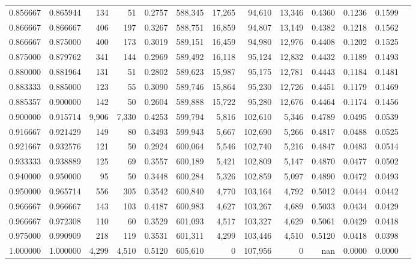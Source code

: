 \begin{tabular}{rrrrrrrrrrrrr}
0.856667 & 0.865944 &    134 &     51 &                                     0.2757 & 588,345 &  17,265 &  94,610 &  13,346 & 0.4360 & 0.1236 & 0.1599 \\
0.866667 & 0.866667 &    406 &    197 &                                     0.3267 & 588,751 &  16,859 &  94,807 &  13,149 & 0.4382 & 0.1218 & 0.1562 \\
0.866667 & 0.875000 &    400 &    173 &                                     0.3019 & 589,151 &  16,459 &  94,980 &  12,976 & 0.4408 & 0.1202 & 0.1525 \\
0.875000 & 0.879762 &    341 &    144 &                                     0.2969 & 589,492 &  16,118 &  95,124 &  12,832 & 0.4432 & 0.1189 & 0.1493 \\
0.880000 & 0.881964 &    131 &     51 &                                     0.2802 & 589,623 &  15,987 &  95,175 &  12,781 & 0.4443 & 0.1184 & 0.1481 \\
0.883333 & 0.885000 &    123 &     55 &                                     0.3090 & 589,746 &  15,864 &  95,230 &  12,726 & 0.4451 & 0.1179 & 0.1469 \\
0.885357 & 0.900000 &    142 &     50 &                                     0.2604 & 589,888 &  15,722 &  95,280 &  12,676 & 0.4464 & 0.1174 & 0.1456 \\
0.900000 & 0.915714 &  9,906 &  7,330 &                                     0.4253 & 599,794 &   5,816 & 102,610 &   5,346 & 0.4789 & 0.0495 & 0.0539 \\
0.916667 & 0.921429 &    149 &     80 &                                     0.3493 & 599,943 &   5,667 & 102,690 &   5,266 & 0.4817 & 0.0488 & 0.0525 \\
0.921667 & 0.932576 &    121 &     50 &                                     0.2924 & 600,064 &   5,546 & 102,740 &   5,216 & 0.4847 & 0.0483 & 0.0514 \\
0.933333 & 0.938889 &    125 &     69 &                                     0.3557 & 600,189 &   5,421 & 102,809 &   5,147 & 0.4870 & 0.0477 & 0.0502 \\
0.940000 & 0.950000 &     95 &     50 &                                     0.3448 & 600,284 &   5,326 & 102,859 &   5,097 & 0.4890 & 0.0472 & 0.0493 \\
0.950000 & 0.965714 &    556 &    305 &                                     0.3542 & 600,840 &   4,770 & 103,164 &   4,792 & 0.5012 & 0.0444 & 0.0442 \\
0.966667 & 0.966667 &    143 &    103 &                                     0.4187 & 600,983 &   4,627 & 103,267 &   4,689 & 0.5033 & 0.0434 & 0.0429 \\
0.966667 & 0.972308 &    110 &     60 &                                     0.3529 & 601,093 &   4,517 & 103,327 &   4,629 & 0.5061 & 0.0429 & 0.0418 \\
0.975000 & 0.990909 &    218 &    119 &                                     0.3531 & 601,311 &   4,299 & 103,446 &   4,510 & 0.5120 & 0.0418 & 0.0398 \\
1.000000 & 1.000000 &  4,299 &  4,510 &                                     0.5120 & 605,610 &       0 & 107,956 &       0 &    nan & 0.0000 & 0.0000 \\
\bottomrule
\end{tabular}
